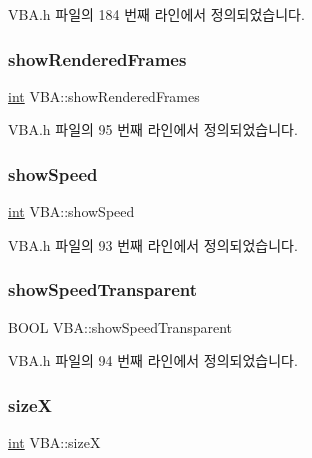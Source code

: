 V\+B\+A.\+h 파일의 184 번째 라인에서 정의되었습니다.

\mbox{\label{class_v_b_a_a2d041dae40bdb47cd6bd28463cc484d9}} 
\subsubsection{\texorpdfstring{show\+Rendered\+Frames}{showRenderedFrames}}
{\footnotesize\ttfamily \mbox{\hyperlink{_util_8cpp_a0ef32aa8672df19503a49fab2d0c8071}{int}} V\+B\+A\+::show\+Rendered\+Frames}



V\+B\+A.\+h 파일의 95 번째 라인에서 정의되었습니다.

\mbox{\label{class_v_b_a_ad86589d0d03fceef36d35c0b2e928e9e}} 
\subsubsection{\texorpdfstring{show\+Speed}{showSpeed}}
{\footnotesize\ttfamily \mbox{\hyperlink{_util_8cpp_a0ef32aa8672df19503a49fab2d0c8071}{int}} V\+B\+A\+::show\+Speed}



V\+B\+A.\+h 파일의 93 번째 라인에서 정의되었습니다.

\mbox{\label{class_v_b_a_a0a2ca5a7091f9c79b39ea0916dd88a05}} 
\subsubsection{\texorpdfstring{show\+Speed\+Transparent}{showSpeedTransparent}}
{\footnotesize\ttfamily B\+O\+OL V\+B\+A\+::show\+Speed\+Transparent}



V\+B\+A.\+h 파일의 94 번째 라인에서 정의되었습니다.

\mbox{\label{class_v_b_a_a7b711f29fd088fa6611d240277a24e9e}} 
\subsubsection{\texorpdfstring{sizeX}{sizeX}}
{\footnotesize\ttfamily \mbox{\hyperlink{_util_8cpp_a0ef32aa8672df19503a49fab2d0c8071}{int}} V\+B\+A\+::sizeX}



